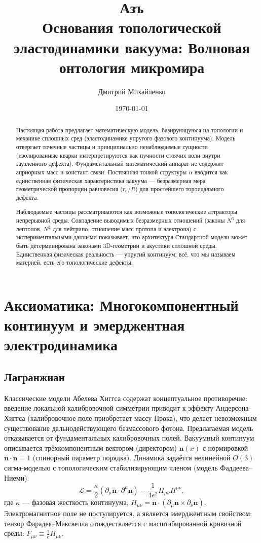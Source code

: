 \documentclass[11pt,a4paper]{article}
\title{\textbf{Азъ\\ Основания топологической эластодинамики вакуума: Волновая онтология микромира}}
\author{Дмитрий Михайленко}
\date{\today}
\begin{document}
	
	\maketitle
	
	\begin{abstract}
		Настоящая работа предлагает математическую модель, базирующуюся на топологии и механике сплошных сред (эластодинамике упругого фазового континуума). Модель отвергает точечные частицы и принципиально ненаблюдаемые сущности (изолированные кварки интерпретируются как пучности стоячих волн внутри заузленного дефекта). Фундаментальный математический аппарат не содержит априорных масс и констант связи. Постоянная тонкой структуры $\alpha$ вводится как единственная физическая характеристика вакуума — безразмерная мера геометрической пропорции равновесия ($r_0/R$) для простейшего тороидального дефекта.
		
		Наблюдаемые частицы рассматриваются как возможные топологические аттракторы непрерывной среды. Совпадение выводимых безразмерных отношений (законы $N^3$ для лептонов, $N^2$ для нейтрино, отношение масс протона и электрона) с экспериментальными данными показывает, что архитектура Стандартной модели может быть детерминирована законами 3D-геометрии и акустики сплошной среды. Единственная физическая реальность — упругий континуум; всё, что мы называем материей, есть его топологические дефекты.
	\end{abstract}
	
	\section{Аксиоматика: Многокомпонентный континуум и эмерджентная электродинамика}
	
	\subsection{Лагранжиан}
	Классические модели Абелева Хиггса содержат концептуальное противоречие: введение локальной калибровочной симметрии приводит к эффекту Андерсона-Хиггса (калибровочное поле приобретает массу Прока), что делает невозможным существование дальнодействующего безмассового фотона. Предлагаемая модель отказывается от фундаментальных калибровочных полей. Вакуумный континуум описывается трёхкомпонентным вектором (директором) $\mathbf{n}(x)$ с нормировкой $\mathbf{n}\cdot\mathbf{n}=1$ (спинорный параметр порядка). Динамика задаётся нелинейной $O(3)$ сигма-моделью с топологическим стабилизирующим членом (модель Фаддеева–Ниеми):
	\begin{equation}
		\mathcal{L} = \frac{\kappa}{2} (\partial_\mu \mathbf{n} \cdot \partial^\mu \mathbf{n}) - \frac{1}{4e^2} H_{\mu\nu} H^{\mu\nu},
	\end{equation}
	где $\kappa$ — фазовая жесткость континуума, $H_{\mu\nu} = \mathbf{n} \cdot (\partial_\mu \mathbf{n} \times \partial_\nu \mathbf{n})$. Электромагнитное поле не постулируется, а является эмерджентным свойством; тензор Фарадея–Максвелла отождествляется с масштабированной кривизной среды: $F_{\mu\nu} \equiv \frac{1}{e} H_{\mu\nu}$.
	
\end{document}
